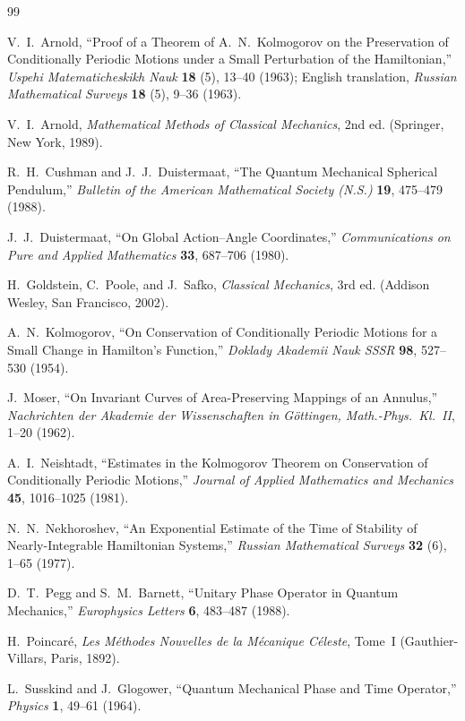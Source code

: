 \documentclass[11pt]{article}
\begin{document}
\begin{thebibliography}{99}

V.~I.~Arnold, ``Proof of a Theorem of A.~N.~Kolmogorov on the Preservation of Conditionally Periodic Motions under a Small Perturbation of the Hamiltonian,'' \emph{Uspehi Matematicheskikh Nauk} \textbf{18} (5), 13--40 (1963); English translation, \emph{Russian Mathematical Surveys} \textbf{18} (5), 9--36 (1963).

V.~I.~Arnold, \emph{Mathematical Methods of Classical Mechanics}, 2nd ed. (Springer, New York, 1989).

R.~H.~Cushman and J.~J.~Duistermaat, ``The Quantum Mechanical Spherical Pendulum,'' \emph{Bulletin of the American Mathematical Society (N.S.)} \textbf{19}, 475--479 (1988).

J.~J.~Duistermaat, ``On Global Action--Angle Coordinates,'' \emph{Communications on Pure and Applied Mathematics} \textbf{33}, 687--706 (1980).

H.~Goldstein, C.~Poole, and J.~Safko, \emph{Classical Mechanics}, 3rd ed. (Addison Wesley, San Francisco, 2002).

A.~N.~Kolmogorov, ``On Conservation of Conditionally Periodic Motions for a Small Change in Hamilton's Function,'' \emph{Doklady Akademii Nauk SSSR} \textbf{98}, 527--530 (1954).

J.~Moser, ``On Invariant Curves of Area-Preserving Mappings of an Annulus,'' \emph{Nachrichten der Akademie der Wissenschaften in G\"ottingen, Math.-Phys.\ Kl.\ II}, 1--20 (1962).

A.~I.~Neishtadt, ``Estimates in the Kolmogorov Theorem on Conservation of Conditionally Periodic Motions,'' \emph{Journal of Applied Mathematics and Mechanics} \textbf{45}, 1016--1025 (1981).

N.~N.~Nekhoroshev, ``An Exponential Estimate of the Time of Stability of Nearly-Integrable Hamiltonian Systems,'' \emph{Russian Mathematical Surveys} \textbf{32} (6), 1--65 (1977).

D.~T.~Pegg and S.~M.~Barnett, ``Unitary Phase Operator in Quantum Mechanics,'' \emph{Europhysics Letters} \textbf{6}, 483--487 (1988).

H.~Poincar\'e, \emph{Les M\'ethodes Nouvelles de la M\'ecanique C\'eleste}, Tome~I (Gauthier-Villars, Paris, 1892).

L.~Susskind and J.~Glogower, ``Quantum Mechanical Phase and Time Operator,'' \emph{Physics} \textbf{1}, 49--61 (1964).

\end{thebibliography}
\end{document}
